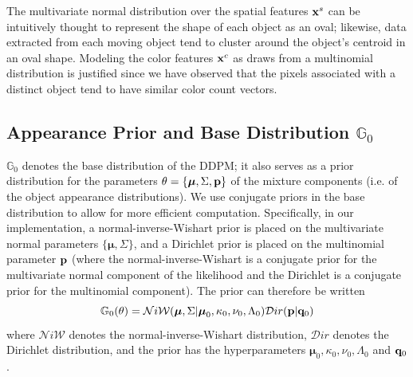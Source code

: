 \documentclass[twocolumn, final]{svjour3}
\begin{document}
The multivariate normal distribution over the spatial features $\bold{x}^{s}$ can be intuitively thought to represent the shape of each object as an oval; likewise, data extracted from each moving object tend to cluster around the object's centroid in an oval shape.
Modeling the color features $\bold{x}^{c}$ as draws from a multinomial distribution is justified since we have observed that the pixels associated with a distinct object tend to have similar color count vectors.


\subsection{Appearance Prior and Base Distribution $\mathbb{G}_{0}$}
\label{sec:appearanceprior}

$\mathbb{G}_{0}$ denotes the base distribution of the DDPM; it also serves as a prior distribution for the parameters $\theta = \{ \boldsymbol{\mu}, \Sigma, \bold{p} \}$ of the mixture components (i.e. of the object appearance distributions). We use conjugate priors in the base distribution to allow for more efficient computation. Specifically, in our implementation, a normal-inverse-Wishart prior is placed on the multivariate normal parameters $\{ \boldsymbol{\mu}, \Sigma \}$, and a Dirichlet prior is placed on the multinomial parameter $\bold{p}$ (where the normal-inverse-Wishart is a conjugate prior for the multivariate normal component of the likelihood and the Dirichlet is a conjugate prior for the multinomial component). The prior can therefore be written
\begin{equation}
\label{basedistro}
\mathbb{G}_{0}(\theta) = \mathcal{N}i\mathcal{W}(\boldsymbol{\mu}, \Sigma | \boldsymbol{\mu}_{0}, \kappa_{0}, \nu_{0}, \Lambda_{0})  \mathcal{D}ir( \bold{p} | \bold{q}_{0})
\end{equation}
where $\mathcal{N}i\mathcal{W}$ denotes the normal-inverse-Wishart distribution, $\mathcal{D}ir$ denotes the Dirichlet distribution, and the prior has the hyperparameters $\boldsymbol{\mu}_{0}, \kappa_{0}, \nu_{0}, \Lambda_{0}$ and $\bold{q}_{0}$.
\end{document}
